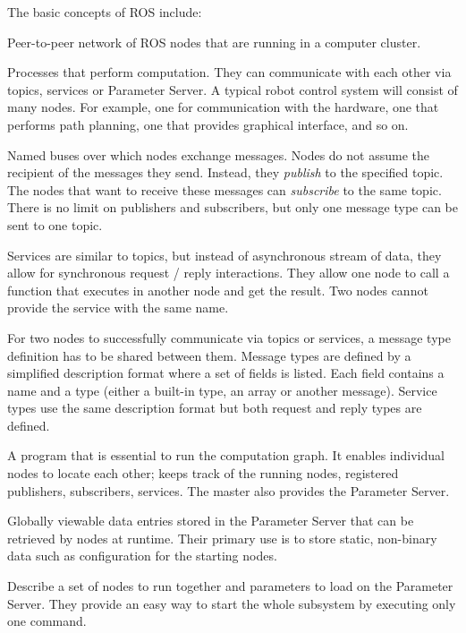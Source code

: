 \documentclass[english,inz,shortabstract]{iithesis}
\begin{document}
	The basic concepts of ROS include:
	\begin{description}[style=nextline]
		\item [Computation graph] \hfill
		Peer-to-peer network of ROS nodes that are running in a computer cluster.
		\item [Nodes] 
		Processes that perform computation. They can communicate with each other via topics, services or Parameter Server. A typical robot control system will consist of many nodes. For example, one for communication with the hardware, one that performs path planning, one that provides graphical interface, and so on.
		\item [Topics] 
		Named buses over which nodes exchange messages. Nodes do not assume the recipient of the messages they send. Instead, they \textit{publish} to the specified topic. The nodes that want to receive these messages can \textit{subscribe} to the same topic. There is no limit on publishers and subscribers, but only one message type can be sent to one topic.
		\item [Services] 
		Services are similar to topics, but instead of asynchronous stream of data, they allow for synchronous request / reply interactions. They allow one node to call a function that executes in another node and get the result. Two nodes cannot provide the service with the same name.
		\item [Message types]
		For two nodes to successfully communicate via topics or services, a message type definition has to be shared between them. Message types are defined by a simplified description format where a set of fields is listed. Each field contains a name and a type (either a built-in type, an array or another message). Service types use the same description format but both request and reply types are defined.
		\item [Master]
		A program that is essential to run the computation graph. It enables individual nodes to locate each other; keeps track of the running nodes, registered publishers, subscribers, services. The master also provides the Parameter Server.  
		\item [Parameters]
		Globally viewable data entries stored in the Parameter Server that can be retrieved by nodes at runtime. Their primary use is to store static, non-binary data such as configuration for the starting nodes.
		\item [Launch files]
		Describe a set of nodes to run together and parameters to load on the Parameter Server. They provide an easy way to start the whole subsystem by executing only one command. 

\end{description}
\end{document}
